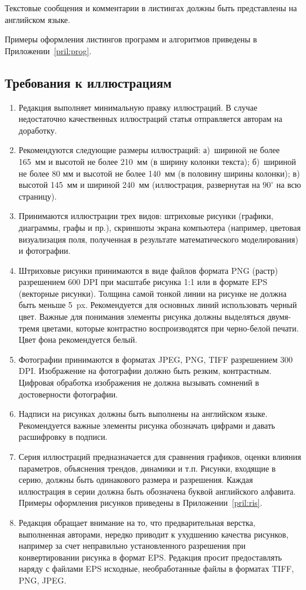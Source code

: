 \documentclass[10pt,a4paper]{book}
\begin{document}
Текстовые сообщения и комментарии в листингах должны быть представлены на английском языке.

Примеры оформления листингов программ и алгоритмов приведены в Приложении~\ref{pril:prog}.



\smallskip
\subsection{Требования к иллюстрациям}
\begin{enumerate}[itemsep=0pt,parsep=2pt,topsep=2pt,partopsep=0pt]
\item Редакция выполняет минимальную правку иллюстраций. В случае недостаточно
      качественных иллюстраций статья отправляется авторам на доработку.
\item Рекомендуются следующие размеры иллюстраций: а)~шириной не более 165~мм и
      высотой не более 210~мм (в ширину колонки текста); б)~шириной не более
      80 мм и высотой не более 140~мм (в половину ширины колонки);
      в) высотой 145~мм и шириной 240~мм (иллюстрация, развернутая на $90^\circ$
      на всю страницу).
\item Принимаются иллюстрации трех видов: штриховые рисунки (графики, диаграммы, графы и пр.),
      скриншоты экрана компьютера (например, цветовая визуализация поля,
      полученная в результате математического моделирования) и фотографии.
\item Штриховые рисунки принимаются в виде файлов формата PNG (растр) разрешением 600 DPI
      при масштабе рисунка 1:1 или в формате EPS (векторные рисунки). Толщина самой тонкой 
      линии на рисунке не должна быть меньше 5~px. Рекомендуется для основных линий 
      использовать черный цвет. Важные для понимания элементы рисунка должны выделяться 
      двумя-тремя цветами, которые контрастно воспроизводятся при черно-белой печати. 
      Цвет фона рекомендуется белый.
\item Фотографии принимаются в форматах JPEG, PNG, TIFF разрешением 300 DPI.
      Изображение на фотографии должно быть резким, контрастным. Цифровая обработка
      изображения не должна вызывать сомнений в достоверности фотографии.
\item Надписи на рисунках должны быть выполнены на английском языке.
      Рекомендуется важные элементы рисунка обозначать цифрами и давать расшифровку в подписи.
\item Серия иллюстраций предназначается для сравнения графиков, оценки влияния
      параметров, объяснения трендов, динамики и т.п. Рисунки, входящие в серию, 
      должны быть одинакового размера и разрешения. Каждая иллюстрация в серии должна 
      быть обозначена буквой английского алфавита. Примеры оформления рисунков 
      приведены в Приложении~\ref{pril:ris}.
\item Редакция обращает внимание на то, что предварительная верстка, выполненная авторами, 
      нередко приводит к ухудшению качества рисунков, например за счет неправильно установленного 
      разрешения при конвертировании рисунка в формат EPS.
      Редакция просит предоставлять наряду с файлами EPS исходные, необработанные 
      файлы в форматах TIFF, PNG, JPEG. 
\end{enumerate}
\end{document}
